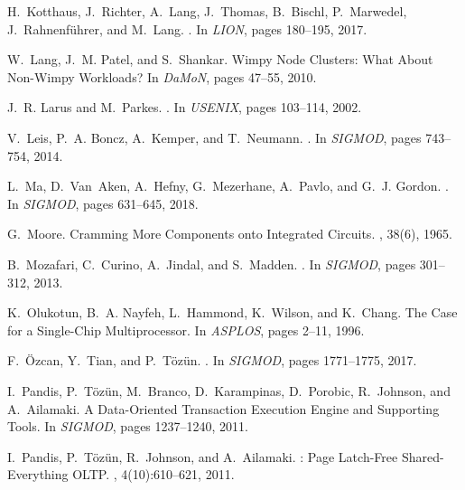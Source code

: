 \documentclass[11pt,dvipdfm]{article}
\begin{document}
\begin{thebibliography}{10}
\begin{small}
H.~Kotthaus, J.~Richter, A.~Lang, J.~Thomas, B.~Bischl, P.~Marwedel,
  J.~Rahnenführer, and M.~Lang.
.
\newblock In {\em LION}, pages 180--195, 2017.

W.~Lang, J.~M. Patel, and S.~Shankar.
\newblock Wimpy {N}ode {C}lusters: {W}hat {A}bout {N}on-{W}impy {W}orkloads?
\newblock In {\em DaMoN}, pages 47--55, 2010.

J.~R. Larus and M.~Parkes.
.
\newblock In {\em USENIX}, pages 103--114, 2002.

V.~Leis, P.~A. Boncz, A.~Kemper, and T.~Neumann.
.
\newblock In {\em SIGMOD}, pages 743--754, 2014.

L.~Ma, D.~Van~Aken, A.~Hefny, G.~Mezerhane, A.~Pavlo, and G.~J. Gordon.
.
\newblock In {\em SIGMOD}, pages 631--645, 2018.

G.~Moore.
\newblock Cramming {M}ore {C}omponents onto {I}ntegrated {C}ircuits.
, 38(6), 1965.

B.~Mozafari, C.~Curino, A.~Jindal, and S.~Madden.
.
\newblock In {\em SIGMOD}, pages 301--312, 2013.

K.~Olukotun, B.~A. Nayfeh, L.~Hammond, K.~Wilson, and K.~Chang.
\newblock The {C}ase for a {S}ingle-{C}hip {M}ultiprocessor.
\newblock In {\em ASPLOS}, pages 2--11, 1996.

F.~{\"{O}}zcan, Y.~Tian, and P.~T{\"{o}}z{\"{u}}n.
.
\newblock In {\em SIGMOD}, pages 1771--1775, 2017.

I.~Pandis, P.~T\"oz\"un, M.~Branco, D.~Karampinas, D.~Porobic, R.~Johnson, and
  A.~Ailamaki.
\newblock A {D}ata-{O}riented {T}ransaction {E}xecution {E}ngine and
  {S}upporting {T}ools.
\newblock In {\em SIGMOD}, pages 1237--1240, 2011.

I.~Pandis, P.~T\"oz\"un, R.~Johnson, and A.~Ailamaki.
: {P}age {L}atch-{F}ree {S}hared-{E}verything {OLTP}.
, 4(10):610--621, 2011.


\end{small}
\end{thebibliography}
\end{document}
